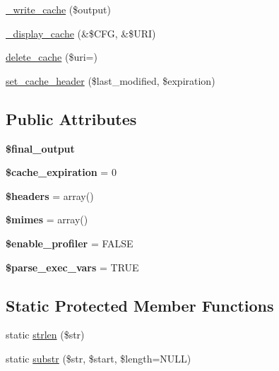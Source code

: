 \begin{DoxyCompactItemize}
\item 
\mbox{\hyperlink{class_c_i___output_a8df67a89f305ed8bf4a9c461d9d8898b}{\+\_\+write\+\_\+cache}} (\$output)
\item 
\mbox{\hyperlink{class_c_i___output_af61960a85a64fe08897bd015fe40f403}{\+\_\+display\+\_\+cache}} (\&\$C\+FG, \&\$U\+RI)
\item 
\mbox{\hyperlink{class_c_i___output_ab04604709591d28b23bceab89d071142}{delete\+\_\+cache}} (\$uri=\textquotesingle{}\textquotesingle{})
\item 
\mbox{\hyperlink{class_c_i___output_a4ec0624cc46657ef58f3b8a8a2fd8b4b}{set\+\_\+cache\+\_\+header}} (\$last\+\_\+modified, \$expiration)
\end{DoxyCompactItemize}
\subsection*{Public Attributes}
\begin{DoxyCompactItemize}
\item 
\mbox{\label{class_c_i___output_a36a1689d550f4d7dab2fa20c4d5723a4}} 
{\bfseries \$final\+\_\+output}
\item 
\mbox{\label{class_c_i___output_ae188b2ed7b23257a932299de10af6212}} 
{\bfseries \$cache\+\_\+expiration} = 0
\item 
\mbox{\label{class_c_i___output_a444a5eb67938bf3bc3b73b4be91a1213}} 
{\bfseries \$headers} = array()
\item 
\mbox{\label{class_c_i___output_a354b602da130d2982c895262dada7d48}} 
{\bfseries \$mimes} = array()
\item 
\mbox{\label{class_c_i___output_af5f476daf6b22a9fb54e4392ea8eec19}} 
{\bfseries \$enable\+\_\+profiler} = F\+A\+L\+SE
\item 
\mbox{\label{class_c_i___output_ae444c837f10f818d91c3ed133b2ad08a}} 
{\bfseries \$parse\+\_\+exec\+\_\+vars} = T\+R\+UE
\end{DoxyCompactItemize}
\subsection*{Static Protected Member Functions}
\begin{DoxyCompactItemize}
\item 
static \mbox{\hyperlink{class_c_i___output_af3284f68f1db3c9d4400289fa494fc52}{strlen}} (\$str)
\item 
static \mbox{\hyperlink{class_c_i___output_a1fe92ef39695c75706284b58438c5864}{substr}} (\$str, \$start, \$length=N\+U\+LL)
\end{DoxyCompactItemize}
